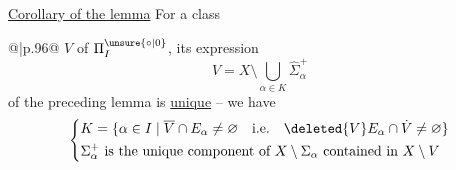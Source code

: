 \uline{Corollary of the lemma} For a class

\noindent\begin{tabular}{@{}|p{.96\linewidth}@{}}
$V$ of $\Pi_I^{\unsure{\circ|0}}$, its expression
\[
V=X\setminus\bigcup_{\alpha\in K}\widehat{\Sigma}_\alpha^+
\]
of the preceding lemma is \uline{unique} -- we have
{\small
\[
\left\{\begin{aligned}
&K=\{\alpha\in I\mid\overline V\cap E_\alpha\ne\varnothing\quad\text{i.e.}\quad\deleted{V}E_\alpha\cap\dot V\ne\varnothing\}\\
&\Sigma_\alpha^+\ \text{is the unique component of }X\setminus\Sigma_\alpha\ \text{contained in }X\setminus V
\end{aligned}\right.
\]}
\end{tabular}
